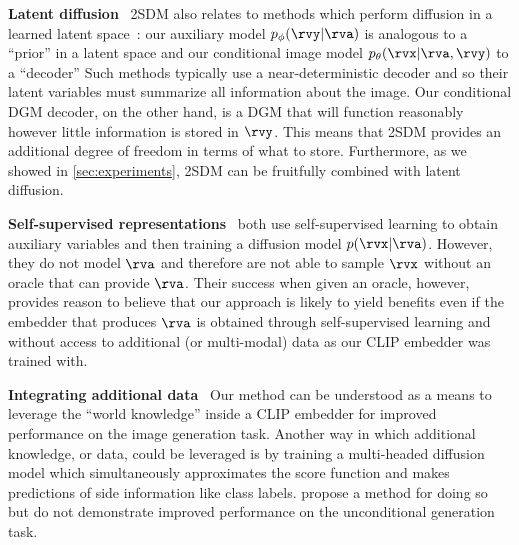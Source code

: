\textbf{Latent diffusion}~
2SDM also relates to methods which perform diffusion in a learned latent space~\citep{rombach2022high}: our auxiliary model $p_\phi(\rvy|\rva)$ is analogous to a ``prior'' in a latent space and our conditional image model $p_\theta(\rvx|\rva,\rvy)$ to a ``decoder'' Such methods typically use a near-deterministic decoder and so their latent variables must summarize all information about the image. Our conditional DGM decoder, on the other hand, is a DGM that will function reasonably however little information is stored in $\rvy$. This means that 2SDM provides an additional degree of freedom in terms of what to store. Furthermore, as we showed in \cref{sec:experiments}, 2SDM can be fruitfully combined with latent diffusion.

\textbf{Self-supervised representations}~
\citet{bao2022conditional,hu2022self} both use self-supervised learning to obtain auxiliary variables and then training a diffusion model $p(\rvx|\rva)$. However, they do not model $\rva$ and therefore are not able to sample $\rvx$ without an oracle that can provide $\rva$. Their success when given an oracle, however, provides reason to believe that our approach is likely to yield benefits even if the embedder that produces $\rva$ is obtained through self-supervised learning and without access to additional (or multi-modal) data as our CLIP embedder was trained with.

\textbf{Integrating additional data}~
Our method can be understood as a means to leverage the ``world knowledge'' inside a CLIP embedder for improved performance on the image generation task. Another way in which additional knowledge, or data, could be leveraged is by training a multi-headed diffusion model which simultaneously approximates the score function and makes predictions of side information like class labels. \citet{deja2023learning} propose a method for doing so but do not demonstrate improved performance on the unconditional generation task.


